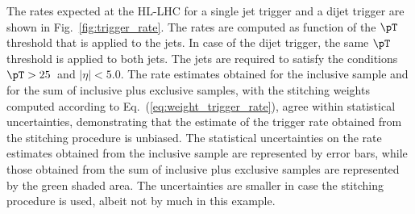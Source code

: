 The rates expected at the HL-LHC for a single jet trigger and a dijet trigger are shown in Fig.~\ref{fig:trigger_rate}.
The rates are computed as function of the $\pT$ threshold that is applied to the jets. 
In case of the dijet trigger, the same $\pT$ threshold is applied to both jets.
The jets are required to satisfy the conditions $\pT > 25$~\GeV and $\vert\eta\vert < 5.0$.
The rate estimates obtained for the inclusive sample and for the sum of inclusive plus exclusive samples, 
with the stitching weights computed according to Eq.~(\ref{eq:weight_trigger_rate}),
agree within statistical uncertainties, demonstrating that the estimate of the trigger rate obtained from the stitching procedure is unbiased.
The statistical uncertainties on the rate estimates obtained from the inclusive sample are represented by error bars,
while those obtained from the sum of inclusive plus exclusive samples are represented by the green shaded area.
The uncertainties are smaller in case the stitching procedure is used, albeit not by much in this example.

